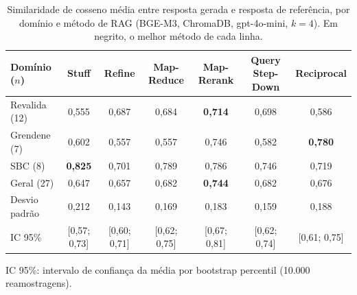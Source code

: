 \begin{table}[!t]
\centering
\footnotesize
\setlength{\tabcolsep}{4pt}
\caption{Similaridade de cosseno média entre resposta gerada e resposta de referência, por domínio e método de RAG (BGE-M3, ChromaDB, gpt-4o-mini, $k=4$). Em negrito, o melhor método de cada linha.}
\label{tab:similaridade_metodos}
\begin{tabular}{lcccccc}
\toprule
Domínio ($n$) & Stuff & Refine & Map-Reduce & Map-Rerank & Query Step-Down & Reciprocal \\
\midrule
Revalida (12) & 0,555 & 0,687 & 0,684 & \textbf{0,714} & 0,698 & 0,586 \\
Grendene (7) & 0,602 & 0,557 & 0,557 & 0,746 & 0,582 & \textbf{0,780} \\
SBC (8) & \textbf{0,825} & 0,701 & 0,789 & 0,786 & 0,746 & 0,719 \\
\midrule
Geral (27) & 0,647 & 0,657 & 0,682 & \textbf{0,744} & 0,682 & 0,676 \\
Desvio padrão & 0,212 & 0,143 & 0,169 & 0,183 & 0,159 & 0,188 \\
IC 95\% & [0,57; 0,73] & [0,60; 0,71] & [0,62; 0,75] & [0,67; 0,81] & [0,62; 0,74] & [0,61; 0,75] \\
\bottomrule
\end{tabular}
\par\smallskip\parbox{0.95\linewidth}{\footnotesize IC 95\%: intervalo de confiança da média por bootstrap percentil (10.000 reamostragens).}
\end{table}
